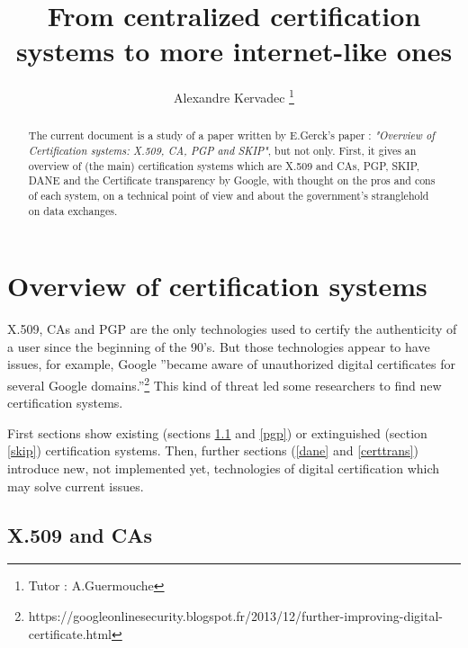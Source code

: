 \documentclass[journal, a4paper]{IEEEtran}
\begin{document}
	\title{From centralized certification systems to more internet-like ones}
	\author{Alexandre Kervadec
	\thanks{Tutor : A.Guermouche}}
	\maketitle

\begin{abstract}
The current document is a study of a paper written by E.Gerck's paper : \textit{"Overview of Certification systems: X.509, CA, PGP and SKIP"}\cite{gerck1998overview}, but not only. First, it gives an overview of (the main) certification systems which are X.509 and CAs, PGP, SKIP, DANE and the Certificate transparency by Google, with thought on the pros and cons of each system, on a technical point of view and about the government's stranglehold on data exchanges.
\end{abstract}

\section{Overview of certification systems}

X.509, CAs and PGP are the only technologies used to certify the authenticity of a user since the beginning of the 90's. But those technologies appear to have issues, for example, Google ''became aware of unauthorized digital certificates for several Google domains.''\footnote{https://googleonlinesecurity.blogspot.fr/2013/12/further-improving-digital-certificate.html} This kind of threat led some researchers to find new certification systems.

First sections show existing (sections \ref{x509} and \ref{pgp}) or extinguished (section \ref{skip}) certification systems. Then, further sections (\ref{dane} and \ref{certtrans}) introduce new, not implemented yet, technologies of digital certification which may solve current issues. 


\subsection{X.509 and CAs}
\label{x509}
\end{document}
